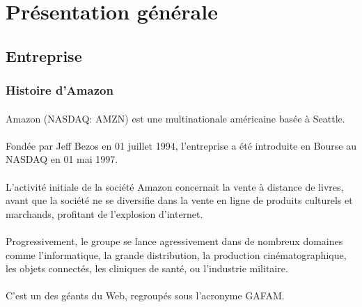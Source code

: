 \section{Présentation générale}

\subsection{Entreprise}
\subsubsection{Histoire d'Amazon}
\paragraph{}
\vspace{-2em}  %
Amazon (NASDAQ: AMZN) est une multinationale américaine basée à Seattle.

\paragraph{}
\vspace{-2em}  %
Fondée par Jeff Bezos en 01 juillet 1994, 
l'entreprise a été introduite en Bourse au NASDAQ en 01 mai 1997.
\paragraph{}
\vspace{-2em}  %
L'activité initiale de la société Amazon concernait la vente à distance de livres, avant que la société ne se diversifie dans la vente en ligne de produits culturels et marchands, profitant de l'explosion d'internet.
\paragraph{}
\vspace{-2em}  %
Progressivement, le groupe se lance agressivement dans de nombreux domaines comme l'informatique, la grande distribution, la production cinématographique, les objets connectés, les cliniques de santé, ou l'industrie militaire.
\paragraph{}
\vspace{-2em}  %
C'est un des géants du Web, regroupés sous l'acronyme GAFAM.


